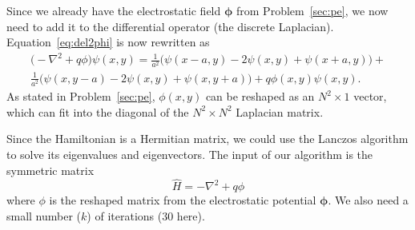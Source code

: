 \Answer{}
Since we already have the electrostatic field \(\bm{\phi}\) from Problem~\ref{sec:pe},
we now need to add it to the differential operator (the discrete Laplacian).
Equation~\eqref{eq:del2phi} is now rewritten as
%
\begin{multline}\label{eq:del2psi}
    \bigl(-\nabla^2 + q \phi\bigr) \psi(x, y) =
    \frac{ 1 }{ a^2 } \bigl(\psi(x - a, y) - 2 \psi(x, y) + \psi(x + a, y)\bigr) +\\
    \frac{ 1 }{ a^2 } \bigl(\psi(x, y - a) - 2 \psi(x, y) + \psi(x, y + a)\bigr) +
    q \phi(x, y) \psi(x, y).
\end{multline}
%
As stated in Problem~\ref{sec:pe},
$\phi(x, y)$ can be reshaped as an \(N^2 \times 1\) vector,
which can fit into the diagonal of the \(N^2 \times N^2\) Laplacian matrix.

Since the Hamiltonian is a Hermitian matrix, we could use the Lanczos algorithm to
solve its eigenvalues and eigenvectors.
The input of our algorithm is the symmetric matrix
%
\begin{equation}\label{eq:hamiltonian}
    \hat{H} = -\nabla^2 + q \phi
\end{equation}
%
where \(\phi\) is the reshaped matrix from the electrostatic potential \(\bm{\phi}\).
We also need a small number ($k$) of iterations (\(30\) here).

